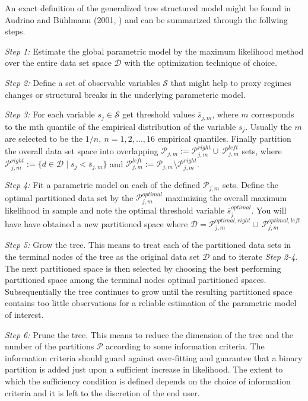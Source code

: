 An exact definition of the generalized tree structured
model might be found in Audrino and B{\"u}hlmann (2001,
\cite{AudrinoBuhlmann}) and can be summarized through the follwing
steps.\\

\setlength{\leftskip}{1cm}
\setlength{\rightskip}{1cm}

\textit{Step 1:} Estimate the global parametric model by the maximum
likelihood method over the entire data set space $\mathcal{D}$ with
the optimization technique of choice.

\textit{Step 2:} Define a set of observable variables $\mathcal{S}$
that might help to proxy regimes changes or structural breaks in the
underlying parameteric model.

\textit{Step 3:} For each variable $s_j \in \mathcal{S}$
get threshold values $\overline{s}_{j,m}$, where $m$ corresponds to
the mth quantile of the empirical distribution of the variable $s_j$.
Usually the $m$ are selected to be the $1/n, \ n = 1, 2, ..., 16$
empirical quantiles. Finally partition the overall data set space into
overlapping
$\mathcal{P}_{j,m} := \mathcal{P}_{j,m}^{right} \cup \
\mathcal{P}_{j,m}^{left}$ sets, where
$\mathcal{P}_{j,m}^{right}:= \{d \in \mathcal{D} \mid s_j <
\overline{s}_{j,m}\}$ and
$\mathcal{P}_{j,m}^{left} := \mathcal{P}_{j,m} \setminus
\mathcal{P}_{j,m}^{right}$.

\textit{Step 4:} Fit a parametric model on each of the defined
$\mathcal{P}_{j,m}$ sets. Define the optimal partitioned data set by
the $\mathcal{P}_{j,m}^{optimal}$ maximizing the overall maximum likelihood in
sample and note the optimal threshold variable $\overline{s}_j^{optimal}$. You
will have have obtained a new partitioned space where
$\mathcal{D} = \mathcal{P}_{j,m}^{optimal, right} \cup \
\mathcal{P}_{j,m}^{optimal, left}$

\textit{Step 5:} Grow the tree. This means to treat each of the
partitioned data sets in the terminal nodes of the tree as the
original data set $\mathcal{D}$ and to iterate \textit{Step 2-4}. The
next partitioned space is then selected by choosing the best
performing partitioned space among the terminal nodes optimal
partitioned spaces. Subsequentially the tree continues to grow until
the resulting partitioned space contains too little observations for a
reliable estimation of the parametric model of interest.

\textit{Step 6:} Prune the tree. This means to reduce the dimension of
the tree and the number of the partitions $\mathcal{P}$ according to
some information criteria. The information criteria should guard
against over-fitting and guarantee that a binary partition is added
just upon a sufficient increase in likelihood. The extent to which the
sufficiency condition is defined depends on the choice of information
criteria and it is left to the discretion of the end user.\\


